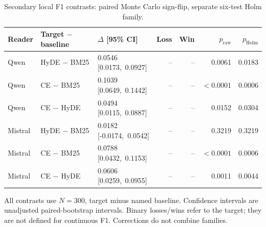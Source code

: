 \begin{table}[htbp]
\centering\footnotesize
\setlength{\tabcolsep}{3pt}
\renewcommand{\arraystretch}{1.08}
\caption{Secondary local F1 contrasts: paired Monte Carlo sign-flip, separate six-test Holm family.}
\label{tab:followup_holdout_f1}
\begin{tabularx}{\textwidth}{l l >{\centering\arraybackslash}X r r r r}
\toprule
Reader & Target $-$ baseline & $\Delta$ [95\% CI] & Loss & Win & $p_{\mathrm{raw}}$ & $p_{\mathrm{Holm}}$ \\
\midrule
Qwen & HyDE $-$ BM25 & \shortstack{0.0546\\\mbox{[0.0173, 0.0927]}} & -- & -- & 0.0061 & 0.0183 \\
Qwen & CE $-$ BM25 & \shortstack{0.1039\\\mbox{[0.0649, 0.1442]}} & -- & -- & $<0.0001$ & 0.0006 \\
Qwen & CE $-$ HyDE & \shortstack{0.0494\\\mbox{[0.0115, 0.0887]}} & -- & -- & 0.0152 & 0.0304 \\
Mistral & HyDE $-$ BM25 & \shortstack{0.0182\\\mbox{[-0.0174, 0.0542]}} & -- & -- & 0.3219 & 0.3219 \\
Mistral & CE $-$ BM25 & \shortstack{0.0788\\\mbox{[0.0432, 0.1153]}} & -- & -- & $<0.0001$ & 0.0006 \\
Mistral & CE $-$ HyDE & \shortstack{0.0606\\\mbox{[0.0259, 0.0955]}} & -- & -- & 0.0011 & 0.0044 \\
\bottomrule
\end{tabularx}
\begin{tablenotes}\footnotesize
\item All contrasts use $N=300$, target minus named baseline. Confidence intervals are unadjusted paired-bootstrap intervals. Binary losses/wins refer to the target; they are not defined for continuous F1. Corrections do not combine families.
\end{tablenotes}
\end{table}

